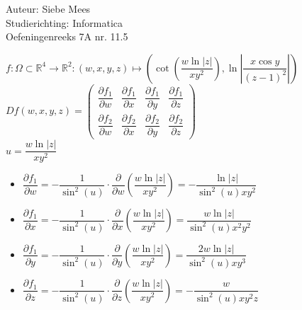 \documentclass[a4paper]{article}
\begin{document}
  
\noindent \large Auteur: Siebe Mees \\
\noindent \large Studierichting: Informatica\\
\noindent \large Oefeningenreeks 7A nr. 11.5\\

\medskip

\normalsize

$ f : \Omega \subset \mathbb{R}^4 \rightarrow \mathbb{R}^2 :(w,x,y,z) \mapsto \left(\cot\left(\dfrac{w \ln |z|}{xy^2}\right),\ln\left|\dfrac{x\cos y}{(z-1)^2}\right|\right) $\\

$ Df(w,x,y,z)=\left(\begin{array}{cccc}\dfrac{\partial f_1}{\partial w}&\dfrac{\partial f_1}{\partial x}&\dfrac{\partial f_1}{\partial y}&\dfrac{\partial f_1}{\partial z}\\ \dfrac{\partial f_2}{\partial w}&\dfrac{\partial f_2}{\partial x}&\dfrac{\partial f_2}{\partial y}&\dfrac{\partial f_2}{\partial z}\end{array}\right) $\\

$ u=\dfrac{w \ln |z|}{xy^2} $\\

\begin{itemize}

\item $ \dfrac{\partial f_1}{\partial w}=-\dfrac{1}{\sin^2(u)}\cdot\dfrac{\partial}{\partial w}\left(\dfrac{w \ln |z|}{xy^2}\right)=-\dfrac{\ln |z|}{\sin^2(u)xy^2} $\\

\item $ \dfrac{\partial f_1}{\partial x}=-\dfrac{1}{\sin^2(u)}\cdot\dfrac{\partial}{\partial x}\left(\dfrac{w \ln |z|}{xy^2}\right)=\dfrac{w \ln |z|}{\sin^2(u)x^2y^2} $\\

\item $ \dfrac{\partial f_1}{\partial y}=-\dfrac{1}{\sin^2(u)}\cdot\dfrac{\partial}{\partial y}\left(\dfrac{w \ln |z|}{xy^2}\right)=\dfrac{2w \ln |z|}{\sin^2(u)xy^3} $\\

\item $ \dfrac{\partial f_1}{\partial z}=-\dfrac{1}{\sin^2(u)}\cdot\dfrac{\partial}{\partial z}\left(\dfrac{w \ln |z|}{xy^2}\right)=-\dfrac{w}{\sin^2(u)xy^2z} $\\

\end{itemize}
\end{document}
